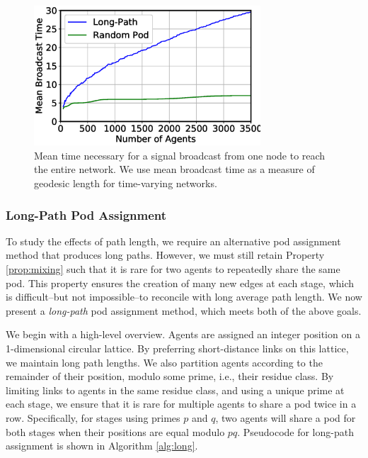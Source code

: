 \begin{figure}
    \centering
    \includegraphics[width=3.33in]{chapters/figures/NetDelibABM/fig-broadcast.eps}
    \caption{Mean time necessary for a signal broadcast from one node to reach the entire network. We use mean broadcast time as a measure of geodesic length for time-varying networks.}
    \label{fig:broadcast}
\end{figure}


\subsubsection{Long-Path Pod Assignment}

To study the effects of path length, we require an alternative pod assignment method that produces long paths.
However, we must still retain Property \ref{prop:mixing} such that it is rare for two agents to repeatedly share the same pod.
This property ensures the creation of many new edges at each stage, which is difficult--but not impossible--to reconcile with long average path length.
We now present a {\em long-path} pod assignment method, which meets both of the above goals.

We begin with a high-level overview.
Agents are assigned an integer position on a 1-dimensional circular lattice.
By preferring short-distance links on this lattice, we maintain long path lengths.
We also partition agents according to the remainder of their position, modulo some prime, i.e., their residue class.
By limiting links to agents in the same residue class, and using a unique prime at each stage, we ensure that it is rare for multiple agents to share a pod twice in a row.
Specifically, for stages using primes $p$ and $q$, two agents will share a pod for both stages when their positions are equal modulo $pq$. Pseudocode for long-path assignment is shown in Algorithm \ref{alg:long}.

